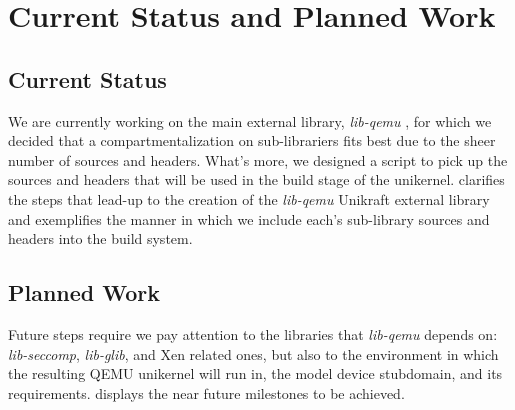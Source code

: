\chapter{Current Status and Planned Work}
\label{chapter:status-planned-work}

\section{Current Status}
\label{sec:current-status}

We are currently working on the main external library, \textit{lib-qemu} \cite{lib-qemu}, for which we decided that a compartmentalization on sub-librariers fits best due to the sheer number of sources and headers.
What's more, we designed a script to pick up the sources and headers that will be used in the build stage of the unikernel.
 clarifies the steps that lead-up to the creation of the \textit{lib-qemu} Unikraft external library and  exemplifies the manner in which we include each's sub-library sources and headers into the build system.


\section{Planned Work}
\label{sec:planned work}

Future steps require we pay attention to the libraries that \textit{lib-qemu} depends on: \textit{lib-seccomp}, \textit{lib-glib}, and Xen related ones, but also to the environment in which the resulting QEMU unikernel will run in, the model device stubdomain, and its requirements.
 displays the near future milestones to be achieved.

